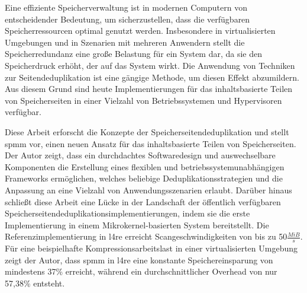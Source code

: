 Eine effiziente Speicherverwaltung ist in modernen Computern von entscheidender Bedeutung, um sicherzustellen, dass die verfügbaren Speicherressourcen optimal genutzt werden.
Insbesondere in virtualisierten Umgebungen und in Szenarien mit mehreren Anwendern stellt die Speicherredundanz eine große Belastung für ein System dar, da sie den Speicherdruck erhöht, der auf das System wirkt.
Die Anwendung von Techniken zur Seitendeduplikation ist eine gängige Methode, um diesen Effekt abzumildern.
Aus diesem Grund sind heute Implementierungen für das inhaltsbasierte Teilen von Speicherseiten in einer Vielzahl von Betriebssystemen und Hypervisoren verfügbar.

Diese Arbeit erforscht die Konzepte der Speicherseitendeduplikation und stellt \acs{spmm} vor, einen neuen Ansatz für das inhaltsbasierte Teilen von Speicherseiten.
Der Autor zeigt, dass ein durchdachtes Softwaredesign und auswechselbare Komponenten die Erstellung eines flexiblen und betriebssystemunabhängigen Frameworks ermöglichen, welches beliebige Deduplikationsstrategien und die Anpassung an eine Vielzahl von Anwendungsszenarien erlaubt.
Darüber hinaus schließt diese Arbeit eine Lücke in der Landschaft der öffentlich verfügbaren Speicherseitendeduplikationsimplementierungen, indem sie die erste Implementierung in einem Mikrokernel-basierten System bereitstellt.
Die Referenzimplementierung in \acs{l4re} erreicht Scangeschwindigkeiten von bis zu 50$\frac{MiB}{s}$.
Für eine beispielhafte Kompressionsarbeitslast in einer virtualisierten Umgebung zeigt der Autor, dass \acs{spmm} in \acs{l4re} eine konstante Speichereinsparung von mindestens 37\% erreicht, während ein durchschnittlicher Overhead von nur 57,38\% entsteht.
